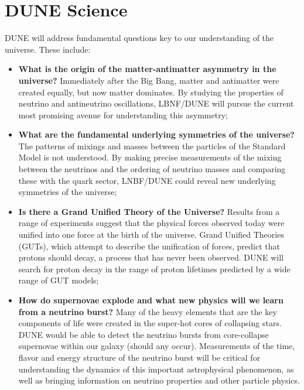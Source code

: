 
\chapter{DUNE Science}
\label{v1ch:science}


DUNE will address fundamental questions key to our understanding of the universe. These include:
\begin{itemize}
   \item {\bf What is the origin of the matter-antimatter asymmetry in the universe?} Immediately after
                    the Big Bang, matter and antimatter were created equally, but now matter dominates.
                    By studying the properties of neutrino and antineutrino oscillations, LBNF/DUNE 
                    will pursue the current most promising avenue for understanding this asymmetry;
   \item {\bf What are the fundamental underlying symmetries of the universe?} The patterns of mixings and masses between the particles of the Standard Model is not understood. By making precise measurements of the mixing between the neutrinos and the ordering of neutrino masses and comparing these with the quark sector, LNBF/DUNE could reveal new underlying symmetries of the universe;
  \item{\bf  Is there a Grand Unified Theory of the Universe?} Results from a range of experiments suggest that the
                 physical forces observed today were unified into one force at the birth of the universe.
                Grand Unified Theories (GUTs), which attempt to describe the unification of forces,
                predict that protons should decay, a process that has never been observed. DUNE will 
                search for proton decay in the range of proton lifetimes predicted by a wide range of GUT models;
   \item{\bf How do supernovae explode and what new physics will we learn from a neutrino burst?}
   Many of the heavy elements that are the key components of life were created in the super-hot cores of collapsing stars. DUNE would be able to detect the neutrino bursts from core-collapse supernovae within our galaxy (should any occur). Measurements of the time, flavor and energy structure of the neutrino burst will be critical for understanding the dynamics of this important astrophysical phenomenon, as well as bringing information on neutrino properties and other particle physics.
\end{itemize}

